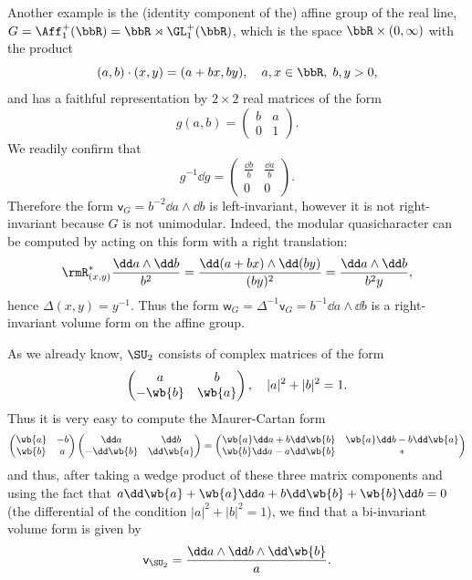 \begin{example}
    Another example is the (identity component of the) affine group of the real line, $G=\Aff^+_1(\bbR)=\bbR\rtimes\GL_1^+(\bbR)$, which is the space $\bbR\times(0,\infty)$ with the product
    \[(a,b)\cdot (x,y)=(a+bx,by),\quad a,x\in\bbR,\;b,y>0,\]
    and has a faithful representation by $2\times 2$ real matrices of the form
    \[g(a,b)=\begin{pmatrix}
        b & a\\ 0&1
    \end{pmatrix}.\]
    We readily confirm that
    \[g^{-1}\dd g=\begin{pmatrix}
        \frac{\dd b}{b} & \frac{\dd a}{b}\\ 0&0
    \end{pmatrix}. \]
    Therefore the form $\mathsf{v}_G=b^{-2}\dd a\wedge \dd b$ is left-invariant, however it is not right-invariant because $G$ is not unimodular. Indeed, the modular quasicharacter can be computed by acting on this form with a right translation:
    \[\rmR_{(x,y)}^\ast \frac{\dd a \wedge \dd b}{b^2}=\frac{\dd (a+bx) \wedge \dd (by)}{(by)^2}=\frac{\dd a\wedge \dd b}{b^2 y},\]
    hence $\Delta(x,y)=y^{-1}$. Thus the form $\mathsf{w}_G=\Delta^{-1}\mathsf{v}_G=b^{-1}\dd a\wedge\dd b$ is a right-invariant volume form on the affine group.
\end{example}


\begin{xca}
    As we already know, $\SU_2$ consists of complex matrices of the form
    \[\begin{pmatrix}
        a&b\\-\wb{b}&\wb{a}
    \end{pmatrix},\quad |a|^2+|b|^2=1.\]
    Thus it is very easy to compute the Maurer-Cartan form
    \[\begin{pmatrix}
        \wb{a}&-b\\\wb{b}&a
    \end{pmatrix} 
    \begin{pmatrix}
        \dd a&\dd b\\-\dd \wb{b}&\dd \wb{a}
    \end{pmatrix}=
    \begin{pmatrix}
        \wb{a}\dd a+b\dd\wb{b} &\wb{a}\dd b-b\dd\wb{a}\\
        \wb{b}\dd a-a\dd\wb{b} & \ast
    \end{pmatrix}
    \]
    and thus, after taking a wedge product of these three matrix components and using the fact that $a\dd\wb{a}+\wb{a}\dd a+b\dd\wb{b}+\wb{b}\dd b=0$ (the differential of the condition $|a|^2+|b|^2=1$), we find that a bi-invariant volume form is given by
    \[\mathsf{v}_{\SU_2}=\frac{\dd a\wedge \dd b\wedge \dd\wb{b}}{a}.\]
\end{xca}

